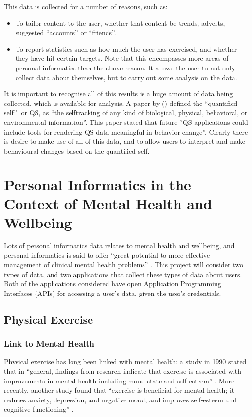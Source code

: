 \documentclass[11pt,openright,a4paper]{report}
\begin{document}
This data is collected for a number of reasons, such as:
\begin{itemize}
\item To tailor content to the user, whether that content be trends, adverts, suggested \enquote{accounts} or \enquote{friends}.
\item To report statistics such as how much the user has exercised, and whether they have hit certain targets. Note that this encompasses more areas of personal informatics than the above reason. It allows the user to not only collect data about themselves, but to carry out some analysis on the data.
\end{itemize}

It is important to recognise all of this results is a huge amount of data being collected, which is available for analysis. A paper by \citeauthor{swan2013quantified} (\citeyear{swan2013quantified}) defined the \enquote{quantified self}, or QS, as \enquote{the selftracking of any kind of biological, physical, behavioral, or environmental information}. This paper stated that future \enquote{QS applications could include tools for rendering QS data meaningful in behavior change}. Clearly there is desire to make use of all of this data, and to allow users to interpret and make behavioural changes based on the quantified self.

\section{Personal Informatics in the Context of Mental Health and Wellbeing} \label{personalinformaticsmentalhealth}
Lots of personal informatics data relates to mental health and wellbeing, and personal informatics is said to offer \enquote{great potential to more effective management of clinical
mental health problems} \parencite{pimentalhealth}. This project will consider two types of data, and two applications that collect these types of data about users. Both of the applications considered have open Application Programming Interfaces (APIs) for accessing a user's data, given the user's credentials.

\subsection{Physical Exercise}
\subsubsection{Link to Mental Health}
Physical exercise has long been linked with mental health; a study in 1990 stated that in \enquote{general, findings from research indicate that exercise is associated with improvements in mental health including mood state and self-esteem} \parencite{raglin1990exercise}. More recently, another study found that \enquote{exercise is beneficial for mental health; it reduces anxiety, depression, and negative mood, and improves self-esteem and cognitive functioning} \parencite{callaghan2004exercise}.
\end{document}
